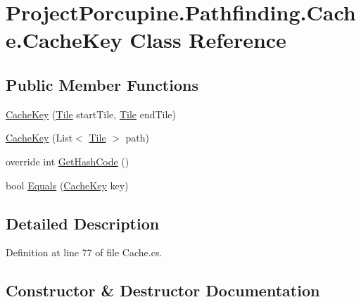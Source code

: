 \hypertarget{class_project_porcupine_1_1_pathfinding_1_1_cache_1_1_cache_key}{}\section{Project\+Porcupine.\+Pathfinding.\+Cache.\+Cache\+Key Class Reference}
\label{class_project_porcupine_1_1_pathfinding_1_1_cache_1_1_cache_key}
\subsection*{Public Member Functions}
\begin{DoxyCompactItemize}
\item 
\hyperlink{class_project_porcupine_1_1_pathfinding_1_1_cache_1_1_cache_key_a80d51b1a390622523682d310890bfad5}{Cache\+Key} (\hyperlink{class_tile}{Tile} start\+Tile, \hyperlink{class_tile}{Tile} end\+Tile)
\item 
\hyperlink{class_project_porcupine_1_1_pathfinding_1_1_cache_1_1_cache_key_a4e02f92e607dce856b434da75a094bee}{Cache\+Key} (List$<$ \hyperlink{class_tile}{Tile} $>$ path)
\item 
override int \hyperlink{class_project_porcupine_1_1_pathfinding_1_1_cache_1_1_cache_key_a19c1083399bdce49ceadc64a7d3c6420}{Get\+Hash\+Code} ()
\item 
bool \hyperlink{class_project_porcupine_1_1_pathfinding_1_1_cache_1_1_cache_key_ae3127ac6c490219cad349208513c3eb2}{Equals} (\hyperlink{class_project_porcupine_1_1_pathfinding_1_1_cache_1_1_cache_key}{Cache\+Key} key)
\end{DoxyCompactItemize}


\subsection{Detailed Description}


Definition at line 77 of file Cache.\+cs.



\subsection{Constructor \& Destructor Documentation}
\mbox{\label{class_project_porcupine_1_1_pathfinding_1_1_cache_1_1_cache_key_a80d51b1a390622523682d310890bfad5}} 
